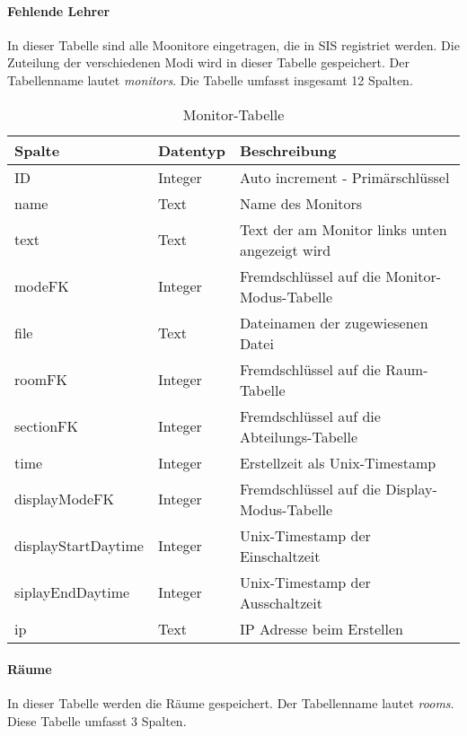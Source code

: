 \paragraph{Fehlende Lehrer\\}
In dieser Tabelle sind alle Moonitore eingetragen, die in SIS registriet werden. Die Zuteilung der verschiedenen Modi wird in dieser Tabelle gespeichert. Der Tabellenname lautet \textit{monitors}. Die Tabelle umfasst insgesamt 12 Spalten.

\begin{table}[H]
\centering
\begin{tabular}{p{3.5 cm}p{2.5 cm}p{9.5 cm}}
   \toprule
   \textbf{Spalte} & \textbf{Datentyp} & \textbf{Beschreibung} \\
   \midrule
          ID & Integer & Auto increment - Primärschlüssel  \\
          \hline
          name & Text & Name des Monitors   \\
          \hline
	      text & Text & Text der am Monitor links unten angezeigt wird  \\
	      \hline
          modeFK & Integer & Fremdschlüssel auf die Monitor-Modus-Tabelle   \\
          \hline
          file & Text & Dateinamen der zugewiesenen Datei    \\
          \hline
          roomFK & Integer & Fremdschlüssel auf die Raum-Tabelle   \\
          \hline
          sectionFK & Integer & Fremdschlüssel auf die Abteilungs-Tabelle   \\
          \hline
	      time & Integer & Erstellzeit als Unix-Timestamp   \\
	      \hline
          displayModeFK & Integer & Fremdschlüssel auf die Display-Modus-Tabelle   \\
          \hline
          displayStartDaytime & Integer & Unix-Timestamp der Einschaltzeit   \\
          \hline
          siplayEndDaytime & Integer & Unix-Timestamp der Ausschaltzeit   \\
          \hline                    	      
          ip & Text & IP Adresse beim Erstellen  \\
   \bottomrule
\end{tabular}
\caption{Monitor-Tabelle}
\end{table}

\paragraph{Räume\\}
In dieser Tabelle werden die Räume gespeichert. Der Tabellenname lautet \textit{rooms}. Diese Tabelle umfasst 3 Spalten.

